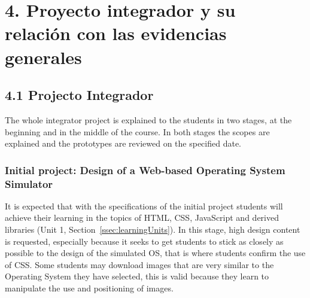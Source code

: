\section{4. Proyecto integrador y su relación con las evidencias generales}
\label{sec:gralIntegratorProject}


\subsection{4.1 Projecto Integrador}
\label{ssec:integratorProject}
The whole integrator project is explained to the students in two stages, 
at the beginning and in the middle of the course. In both stages the scopes 
are explained and the prototypes are reviewed on the specified date.

\subsubsection{Initial project: Design of a Web-based Operating System Simulator}
\label{sssec:desginOS}
It is expected that with the specifications of the initial project students 
will achieve their learning in the topics of HTML, CSS, JavaScript and derived 
libraries (Unit 1, Section~\ref{ssec:learningUnits}). In this stage, high design 
content is requested, especially because it seeks to get students to stick as 
closely as possible to the design of the simulated OS, that is where students 
confirm the use of CSS. Some students may download images that are very similar 
to the Operating System they have selected, this is valid because they learn to 
manipulate the use and positioning of images.

